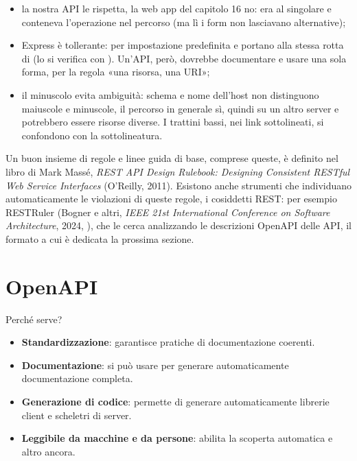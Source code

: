 \begin{itemize}
  \item la nostra API le rispetta, la web app del capitolo 16 no: 
        era al singolare e  conteneva l'operazione nel
        percorso (ma lì i form non lasciavano alternative);
  \item Express è tollerante: per impostazione predefinita  e
         portano alla stessa rotta di  (lo si
        verifica con ). Un'API, però, dovrebbe documentare e usare
        una sola forma, per la regola «una risorsa, una URI»;
  \item il minuscolo evita ambiguità: schema e nome dell'host non distinguono
        maiuscole e minuscole, il percorso in generale sì, quindi su un altro
        server  e  potrebbero essere risorse
        diverse. I trattini bassi, nei link sottolineati, si confondono con la
        sottolineatura.
\end{itemize}

Un buon insieme di regole e linee guida di base, comprese queste, è definito
nel libro di Mark Massé, \textit{REST API Design Rulebook: Designing Consistent
RESTful Web Service Interfaces} (O'Reilly, 2011). Esistono anche strumenti che
individuano automaticamente le violazioni di queste regole, i cosiddetti
 REST: per esempio RESTRuler (Bogner e altri, \textit{IEEE
21st International Conference on Software Architecture}, 2024,
), che le cerca analizzando le
descrizioni OpenAPI delle API, il formato a cui è dedicata la prossima sezione.

\section{OpenAPI}


Perché serve?

\begin{itemize}
  \item \textbf{Standardizzazione}: garantisce pratiche di documentazione
        coerenti.
  \item \textbf{Documentazione}: si può usare per generare automaticamente
        documentazione completa.
  \item \textbf{Generazione di codice}: permette di generare automaticamente
        librerie client e scheletri di server.
  \item \textbf{Leggibile da macchine e da persone}: abilita la scoperta
        automatica e altro ancora.
\end{itemize}

